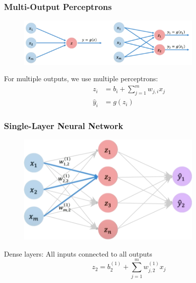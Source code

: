 \documentclass{beamer}
\begin{document}
\begin{frame}
\frametitle{Multi-Output Perceptrons}
\begin{figure}
\includegraphics[width=0.8\textwidth]{multioutput-perceptrons.png}
\end{figure}

For multiple outputs, we use multiple perceptrons:
\begin{align}
z_i &= b_i + \sum_{j=1}^{m} w_{j,i} x_j \\
\hat{y}_i &= g(z_i)
\end{align}
\end{frame}

\begin{frame}
\frametitle{Single-Layer Neural Network}
\begin{figure}
\includegraphics[width=0.8\textwidth]{single-layer-nn1.png}
\end{figure}

Dense layers: All inputs connected to all outputs
\begin{equation}
z_2 = b_2^{(1)} + \sum_{j=1}^m w_{j,2}^{(1)} x_j
\end{equation}
\end{frame}
\end{document}
